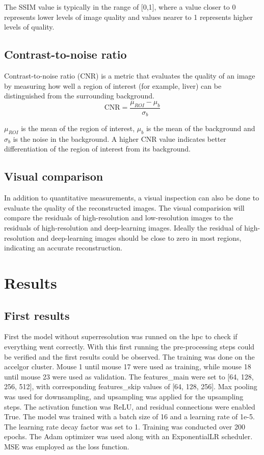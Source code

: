 \documentclass[twocolumn]{article}
\begin{document}
 The SSIM value is typically in the range of [0,1], where a value closer to 0 represents lower levels of image quality and values nearer to 1 represents higher levels of quality. \cite{dosselmann-2009}

 \subsection{Contrast-to-noise ratio}
 Contrast-to-noise ratio (CNR) is a metric that evaluates the quality of an image by measuring how well a region of interest (for example, liver) can be distinguished from the surrounding background.
\begin{equation}\label{CNR}
\text{CNR}=\frac{\mu_{ROI}-\mu_b}{\sigma_b}
\end{equation}

$\mu_{ROI}$ is the mean of the region of interest, $\mu_b$ is the mean of the background and $\sigma_b$ is the noise in the background.
A higher CNR value indicates better differentiation of the region of interest from its background.

\subsection{Visual comparison}
In addition to quantitative measurements, a visual inspection can also be done to evaluate the quality of the reconstructed images. 
The visual comparision will compare the residuals of high-resolution and low-resolution images to the residuals of high-resolution and deep-learning images. 
Ideally the residual of high-resolution and deep-learning images should be close to zero in most regions, indicating an accurate reconstruction. 

\section{Results}
\subsection{First results}
First the model without superresolution was runned on the hpc to check if everything went correctly. 
With this first running the pre-processing steps could be verified and the first results could be observed. 
The training was done on the accelgor cluster. 
Mouse 1 until mouse 17 were used as training, while mouse 18 until mouse 23 were used as validation.  
The features\_main were set to [64, 128, 256, 512], with corresponding features\_skip values of [64, 128, 256]. 
Max pooling was used for downsampling, and upsampling was applied for the upsampling steps. 
The activation function was ReLU, and residual connections were enabled True.
The model was trained with a batch size of 16 and a learning rate of 1e-5. 
The learning rate decay factor was set to 1. Training was conducted over 200 epochs. 
The Adam optimizer was used along with an ExponentialLR scheduler. MSE was employed as the loss function.
\end{document}
